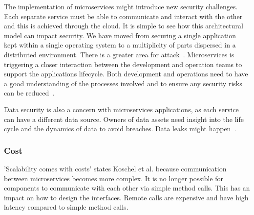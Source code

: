 The implementation of microservices might introduce new security challenges. Each separate service must be able to communicate and interact with the other and this is achieved through the cloud. It is simple to see how this architectural model can impact security. We have moved from securing a single application kept within a single operating system to a multiplicity of parts dispersed in a distributed environment. There is a greater area for attack~\cite{Zaytev2018}. Microservices is triggering a closer interaction between the development and operation teams to support the applications lifecycle. Both development and operations need to have a good understanding of the processes involved and to ensure any security risks can be reduced~\cite{Aaron2018,Amazon,Gonchar2017}.

Data security is also a concern with microservices applications, as each service can have a different data source. Owners of data assets need insight into the life cycle and the dynamics of data to avoid breaches. Data leaks might happen~\cite{tenev2019}. 


\subsubsection{Cost}%
'Scalability comes with costs' states Koschel et al.\cite{Koschel2017}  because communication between microservices becomes more complex. It is no longer possible for components to communicate with each other via simple method calls. %
This has an impact on how to design the interfaces. 
Remote calls are expensive and have high latency compared to simple method calls\cite{Koschel2017, McElhiney2018}.


